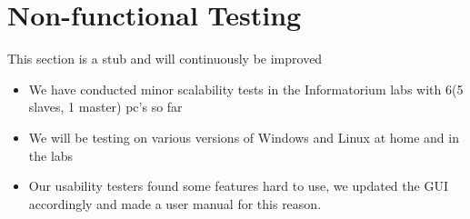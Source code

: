 \documentclass[a4paper,12pt,final]{article}
\begin{document}
\newpage
\section{Non-functional Testing}
This section is a stub and will continuously be improved
\begin{itemize}
\item We have conducted minor scalability tests in the Informatorium labs with 6(5 slaves, 1 master) pc's so far
\item We will be testing on various versions of Windows and Linux at home and in the labs
\item Our usability testers found some features hard to use, we updated the GUI accordingly and made a user manual for this reason.
\end{itemize}
\end{document}

